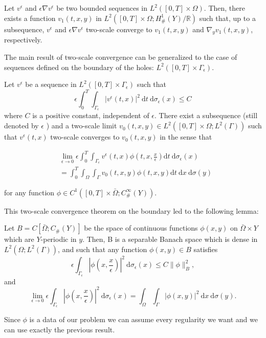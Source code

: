 \begin{theorem} Let $v^{\epsilon}$ and $\epsilon \nabla v^{\epsilon}$ be two bounded sequences in $L^{2}([0, T] \times \Omega)$. Then, there exists a function $v_{1}(t, x, y)$ in $L^{2}\left([0, T] \times \Omega ; H_{\#}^{1}(Y) / \mathbb{R}\right)$ such that, up to a subsequence, $v^{\epsilon}$ and $\epsilon \nabla v^{\epsilon}$ two-scale converge to $v_{1}(t, x, y)$ and $\nabla_{y} v_{1}(t, x, y)$, respectively.
\label{theorem 7.4}\end{theorem}
The main result of two-scale convergence can be generalized to the case of sequences defined on the boundary of the holes: $L^{2}\left([0, T] \times \Gamma_{\epsilon}\right)$.
\begin{theorem}
Let $v^{\epsilon}$ be a sequence in $L^{2}\left([0, T] \times \Gamma_{\epsilon}\right)$ such that
$$
\epsilon \int_{0}^{T} \int_{\Gamma_{\epsilon}}\left|v^{\epsilon}(t, x)\right|^{2} \mathrm{~d} t \mathrm{~d} \sigma_{\epsilon}(x) \leq C
$$
where $C$ is a positive constant, independent of $\epsilon$. There exist a subsequence (still denoted by $\epsilon$ ) and a two-scale limit $v_{0}(t, x, y) \in L^{2}\left([0, T] \times \Omega ; L^{2}(\Gamma)\right)$ such that $v^{\epsilon}(t, x)$ two-scale converges to $v_{0}(t, x, y)$ in the sense that

$$
\begin{aligned}
&\lim _{\epsilon \rightarrow 0} \epsilon \int_{0}^{T} \int_{\Gamma_{\epsilon}} v^{\epsilon}(t, x) \phi\left(t, x, \frac{x}{\epsilon}\right) \mathrm{d} t \mathrm{~d} \sigma_{\epsilon}(x) \\
&=\int_{0}^{T} \int_{\Omega} \int_{\Gamma} v_{0}(t, x, y) \phi(t, x, y) \mathrm{d} t \mathrm{~d} x \mathrm{~d} \sigma(y)
\end{aligned}
$$

for any function $\phi \in C^{1}\left([0, T] \times \bar{\Omega} ; C_{\#}^{\infty}(Y)\right)$.
\label{theorem 7.5}\end{theorem}
This two-scale convergence theorem on the boundary led to the following lemma:
\begin{lemma} Let $B=C\left[\bar{\Omega} ; C_{\#}(Y)\right]$ be the space of continuous functions $\phi(x, y)$ on $\bar{\Omega} \times Y$ which are $Y$-periodic in $y$. Then, B is a separable Banach space which is dense in $L^{2}\left(\Omega ; L^{2}(\Gamma)\right)$, and such that any function $\phi(x, y) \in B$ satisfies
$$
\epsilon \int_{\Gamma_{\epsilon}}\left|\phi\left(x, \frac{x}{\epsilon}\right)\right|^{2} \mathrm{~d} \sigma_{\epsilon}(x) \leq C\|\phi\|_{B}^{2},
$$
and
$$
\lim _{\epsilon \rightarrow 0} \epsilon \int_{\Gamma_{\epsilon}}\left|\phi\left(x, \frac{x}{\epsilon}\right)\right|^{2} \mathrm{~d} \sigma_{\epsilon}(x)=\int_{\Omega} \int_{\Gamma}|\phi(x, y)|^{2} \mathrm{~d} x \mathrm{~d} \sigma(y) .
$$
\label{lemma 7.4}\end{lemma}
Since $\phi$ is a data of our problem we can assume every regularity we want and we can use exactly the previous result.
